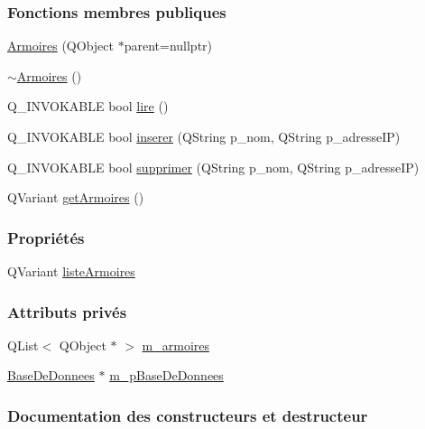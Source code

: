 \subsubsection*{Fonctions membres publiques}
\begin{DoxyCompactItemize}
\item 
\hyperlink{class_armoires_a0783981e55af5badbcb4b8eb5a52a0eb}{Armoires} (Q\+Object $\ast$parent=nullptr)
\item 
\hyperlink{class_armoires_ae486320e819485eb011bb952aced3de2}{$\sim$\+Armoires} ()
\item 
Q\+\_\+\+I\+N\+V\+O\+K\+A\+B\+LE bool \hyperlink{class_armoires_a2b64b3df08cf848d06b4ffb6a49ae858}{lire} ()
\item 
Q\+\_\+\+I\+N\+V\+O\+K\+A\+B\+LE bool \hyperlink{class_armoires_a0aa944d8f94667783ea95424e1915aba}{inserer} (Q\+String p\+\_\+nom, Q\+String p\+\_\+adresse\+IP)
\item 
Q\+\_\+\+I\+N\+V\+O\+K\+A\+B\+LE bool \hyperlink{class_armoires_aa8cb545cec5ebf4603dff93e87662cc9}{supprimer} (Q\+String p\+\_\+nom, Q\+String p\+\_\+adresse\+IP)
\item 
Q\+Variant \hyperlink{class_armoires_a4ad204a0768f9aa9cfb400a362ae7b07}{get\+Armoires} ()
\end{DoxyCompactItemize}
\subsubsection*{Propriétés}
\begin{DoxyCompactItemize}
\item 
Q\+Variant \hyperlink{class_armoires_aa17b53e9003fe2285d7e9e0ad6999137}{liste\+Armoires}
\end{DoxyCompactItemize}
\subsubsection*{Attributs privés}
\begin{DoxyCompactItemize}
\item 
Q\+List$<$ Q\+Object $\ast$ $>$ \hyperlink{class_armoires_a13bc03c96ba9e069bc377f6ea10472ba}{m\+\_\+armoires}
\item 
\hyperlink{class_base_de_donnees}{Base\+De\+Donnees} $\ast$ \hyperlink{class_armoires_a096a57892eaad473fefc2a20fe4965bd}{m\+\_\+p\+Base\+De\+Donnees}
\end{DoxyCompactItemize}


\subsubsection{Documentation des constructeurs et destructeur}
\mbox{\label{class_armoires_a0783981e55af5badbcb4b8eb5a52a0eb}} 
